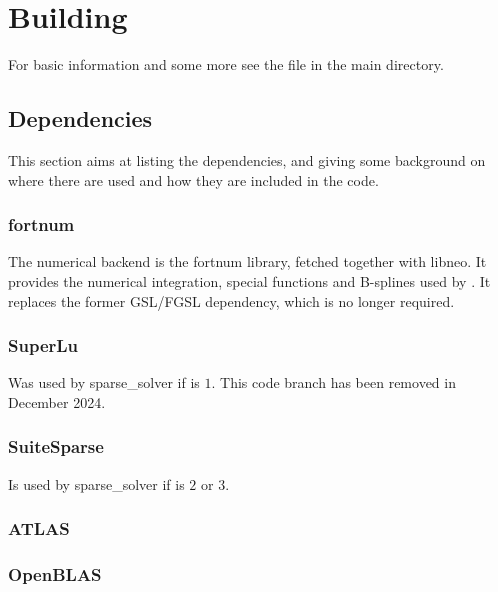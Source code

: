 \chapter{Building}
For basic information and some more see the file  in the
\neotwo main directory.

\section{Dependencies}
This section aims at listing the dependencies, and giving some
background on where there are used and how they are included in the
code.

\subsection{fortnum}
The numerical backend is the fortnum library, fetched together with
libneo. It provides the numerical integration, special functions and
B-splines used by \neotwo. It replaces the former GSL/FGSL dependency,
which is no longer required.

\subsection{SuperLu}
Was used by sparse\_solver if  is $1$.
This code branch has been removed in December 2024.

\subsection{SuiteSparse}
Is used by sparse\_solver if  is
$2$ or $3$.

\subsection{ATLAS}

\subsection{OpenBLAS}

